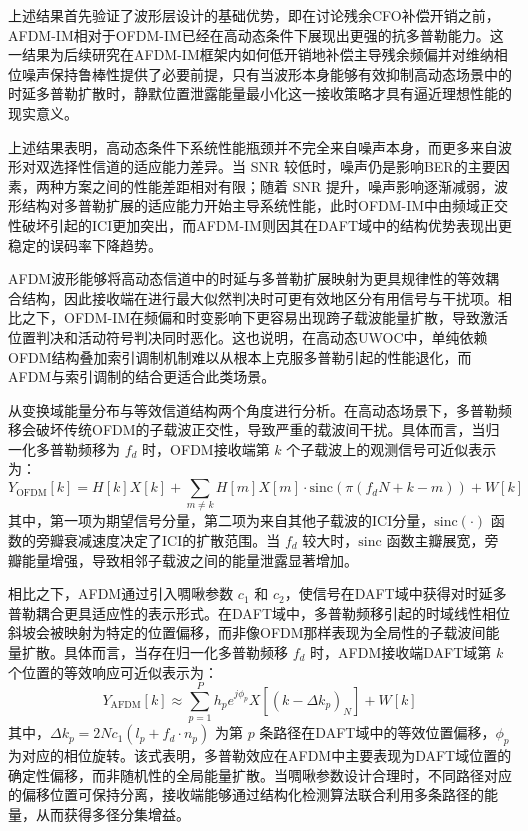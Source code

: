 上述结果首先验证了波形层设计的基础优势，即在讨论残余CFO补偿开销之前，AFDM-IM相对于OFDM-IM已经在高动态条件下展现出更强的抗多普勒能力。这一结果为后续研究在AFDM-IM框架内如何低开销地补偿主导残余频偏并对维纳相位噪声保持鲁棒性提供了必要前提，只有当波形本身能够有效抑制高动态场景中的时延多普勒扩散时，静默位置泄露能量最小化这一接收策略才具有逼近理想性能的现实意义。

上述结果表明，高动态条件下系统性能瓶颈并不完全来自噪声本身，而更多来自波形对双选择性信道的适应能力差异。当 SNR 较低时，噪声仍是影响BER的主要因素，两种方案之间的性能差距相对有限；随着 SNR 提升，噪声影响逐渐减弱，波形结构对多普勒扩展的适应能力开始主导系统性能，此时OFDM-IM中由频域正交性破坏引起的ICI更加突出，而AFDM-IM则因其在DAFT域中的结构优势表现出更稳定的误码率下降趋势。

AFDM波形能够将高动态信道中的时延与多普勒扩展映射为更具规律性的等效耦合结构，因此接收端在进行最大似然判决时可更有效地区分有用信号与干扰项。相比之下，OFDM-IM在频偏和时变影响下更容易出现跨子载波能量扩散，导致激活位置判决和活动符号判决同时恶化。这也说明，在高动态UWOC中，单纯依赖OFDM结构叠加索引调制机制难以从根本上克服多普勒引起的性能退化，而AFDM与索引调制的结合更适合此类场景。


从变换域能量分布与等效信道结构两个角度进行分析。在高动态场景下，多普勒频移会破坏传统OFDM的子载波正交性，导致严重的载波间干扰。具体而言，当归一化多普勒频移为 $f_d$ 时，OFDM接收端第 $k$ 个子载波上的观测信号可近似表示为：
\begin{equation}
Y_{\mathrm{OFDM}}[k] = H[k]X[k] + \sum_{m \neq k} H[m]X[m] \cdot \mathrm{sinc}(\pi(f_d N + k - m)) + W[k]
\end{equation}
其中，第一项为期望信号分量，第二项为来自其他子载波的ICI分量，$\mathrm{sinc}(\cdot)$ 函数的旁瓣衰减速度决定了ICI的扩散范围。当 $f_d$ 较大时，$\mathrm{sinc}$ 函数主瓣展宽，旁瓣能量增强，导致相邻子载波之间的能量泄露显著增加。

相比之下，AFDM通过引入啁啾参数 $c_1$ 和 $c_2$，使信号在DAFT域中获得对时延多普勒耦合更具适应性的表示形式。在DAFT域中，多普勒频移引起的时域线性相位斜坡会被映射为特定的位置偏移，而非像OFDM那样表现为全局性的子载波间能量扩散。具体而言，当存在归一化多普勒频移 $f_d$ 时，AFDM接收端DAFT域第 $k$ 个位置的等效响应可近似表示为：
\begin{equation}
Y_{\mathrm{AFDM}}[k] \approx \sum_{p=1}^{P} h_p e^{j\phi_p} X[(k - \Delta k_p)_N] + W[k]
\end{equation}
其中，$\Delta k_p = 2Nc_1(l_p + f_d \cdot n_p)$ 为第 $p$ 条路径在DAFT域中的等效位置偏移，$\phi_p$ 为对应的相位旋转。该式表明，多普勒效应在AFDM中主要表现为DAFT域位置的确定性偏移，而非随机性的全局能量扩散。当啁啾参数设计合理时，不同路径对应的偏移位置可保持分离，接收端能够通过结构化检测算法联合利用多条路径的能量，从而获得多径分集增益。

